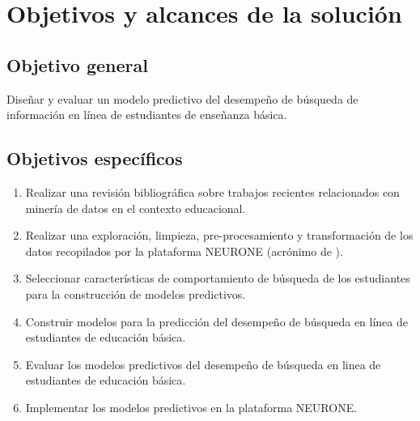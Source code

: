 \chapter{Objetivos y alcances de la solución}
\label{chp:objetivos}
\setcounter{page}{1}

\section{Objetivo general}
\label{sec:objetivo-general}
Diseñar y evaluar un modelo predictivo del desempeño de búsqueda de información en línea de estudiantes de enseñanza básica.

\section{Objetivos específicos}
\label{sec:objetivo-especificos}

\begin{enumerate}
	\item Realizar una revisión bibliográfica sobre trabajos recientes relacionados con minería de datos en el contexto educacional.
	\item Realizar una exploración, limpieza, pre-procesamiento y transformación de los datos recopilados por la plataforma NEURONE (acrónimo de ).
	\item Seleccionar características de comportamiento de búsqueda de los estudiantes para la construcción de modelos predictivos.
	\item Construir modelos para la predicción del desempeño de búsqueda en línea de estudiantes de educación básica.
	\item Evaluar los modelos predictivos del desempeño de búsqueda en linea de estudiantes de educación básica.
	\item Implementar los modelos predictivos en la plataforma NEURONE.
\end{enumerate}